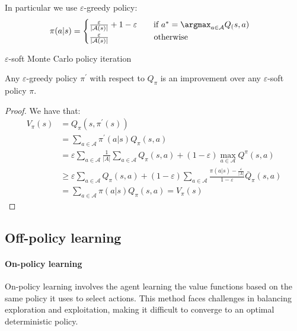 In particular we use $\varepsilon$-greedy policy:
\[\pi(a|s)=\begin{cases}
    \frac{\varepsilon}{\left\lvert \mathcal{A}(s)\right\rvert}+1-\varepsilon \qquad \text{if }a^\ast=\argmax_{a\in\mathcal{A}}Q_(s,a) \\
    \frac{\varepsilon}{\left\lvert \mathcal{A}(s)\right\rvert}\qquad\qquad\quad\:\:\text{otherwise}
\end{cases}\]
\begin{algorithm}[H]
    \caption{$\varepsilon$-soft Monte Carlo policy iteration}
        \begin{algorithmic}[1]
        \end{algorithmic}
\end{algorithm}
\begin{theorem}
    Any $\varepsilon$-greedy policy $\pi^\prime$ with respect to $Q_{\pi}$ is an improvement over any $\varepsilon$-soft policy $\pi$. 
\end{theorem}
\begin{proof}
    We have that: 
    \begin{align*}
        V_{\pi}(s)  &= Q_{\pi}(s, \pi^\prime(s)) \\
                    &= \sum_{a \in \mathcal{A}} \pi^\prime(a|s)Q_{\pi}(s, a) \\
                    &= \varepsilon \sum_{a \in \mathcal{A}} \frac{1}{|A|} \sum_{a \in \mathcal{A}} Q_{\pi}(s, a) + (1 - \varepsilon) \max_{a \in \mathcal{A}} Q^{\pi}(s, a) \\
                    &\geq \varepsilon \sum_{a \in \mathcal{A}} Q_{\pi}(s, a) + (1 - \varepsilon) \sum_{a \in \mathcal{A}} \frac{\pi(a|s) - \frac{\varepsilon}{|A|}}{1 - \varepsilon} \bar{Q}_{\pi}(s, a) \\
                    &= \sum_{a \in \mathcal{A}} \pi(a|s)Q_{\pi}(s, a) = V_{\pi}(s)
    \end{align*}
\end{proof}

\subsection{Off-policy learning}
\paragraph*{On-policy learning}
On-policy learning involves the agent learning the value functions based on the same policy it uses to select actions. 
This method faces challenges in balancing exploration and exploitation, making it difficult to converge to an optimal deterministic policy.

